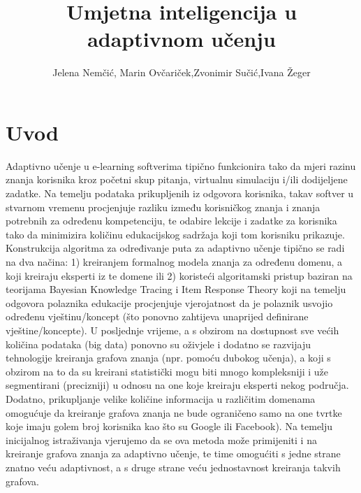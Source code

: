 \documentclass[times, utf8,projekt]{fer}
\begin{document}

\title{Umjetna inteligencija u adaptivnom učenju}

\author{Jelena Nemčić, Marin Ovčariček,Zvonimir Sučić,Ivana Žeger}

\maketitle
\tableofcontents
\chapter{Uvod}
Adaptivno učenje u e-learning softverima tipično funkcionira tako da mjeri razinu znanja korisnika kroz početni skup pitanja, virtualnu simulaciju i/ili dodijeljene zadatke. Na temelju podataka prikupljenih iz odgovora korisnika, takav softver u stvarnom vremenu procjenjuje razliku između korisničkog znanja i znanja potrebnih za određenu kompetenciju, te odabire lekcije i zadatke za korisnika tako da minimizira količinu edukacijskog sadržaja koji tom korisniku prikazuje.\newline
Konstrukcija algoritma za određivanje puta za adaptivno učenje tipično se radi na dva načina: 1) kreiranjem formalnog modela znanja za određenu domenu, a koji kreiraju eksperti iz te domene ili 2) koristeći algoritamski pristup baziran na teorijama Bayesian Knowledge Tracing i Item Response Theory koji na temelju odgovora polaznika edukacije procjenjuje vjerojatnost da je polaznik usvojio određenu vještinu/koncept (što ponovno zahtijeva unaprijed definirane vještine/koncepte).\newline
U posljednje vrijeme, a s obzirom na dostupnost sve većih količina podataka (big data) ponovno su oživjele i dodatno se razvijaju tehnologije kreiranja grafova znanja (npr. pomoću dubokog učenja), a koji s obzirom na to da su kreirani statistički mogu biti mnogo kompleksniji i uže segmentirani (precizniji) u odnosu na one koje kreiraju eksperti nekog područja. Dodatno, prikupljanje velike količine informacija u različitim domenama omogućuje da kreiranje grafova znanja ne bude ograničeno samo na one tvrtke koje imaju golem broj korisnika kao što su Google ili Facebook). Na temelju inicijalnog istraživanja vjerujemo da se ova metoda može primijeniti i na kreiranje grafova znanja za adaptivno učenje, te time omogućiti s jedne strane znatno veću adaptivnost, a s druge strane veću jednostavnost kreiranja takvih grafova.\newline
\end{document}
